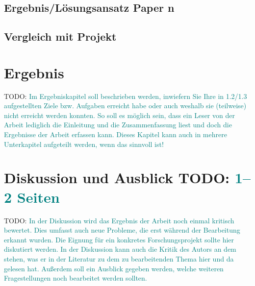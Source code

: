 \documentclass[headsepline,titlepage,ngerman,twoside,12pt]{report}
\newcommand\todo[1]{TODO: \textcolor{teal}{#1}}
\begin{document}
\section{Ergebnis/Lösungsansatz Paper n}
\section{Vergleich mit Projekt}

\chapter{Ergebnis}
\todo{
Im Ergebniskapitel soll beschrieben werden, inwiefern Sie Ihre in 1.2/1.3 aufgestellten Ziele bzw. Aufgaben erreicht habe oder auch weshalb sie (teilweise) nicht erreicht werden konnten.
So soll es möglich sein, dass ein Leser von der Arbeit lediglich die Einleitung und die Zusammenfassung liest und doch die Ergebnisse der Arbeit erfassen kann.
Dieses Kapitel kann auch in mehrere Unterkapitel aufgeteilt werden, wenn das sinnvoll ist!
}

\chapter{Diskussion und Ausblick \todo{1--2 Seiten}}
\todo{
In der Diskussion wird das Ergebnis der Arbeit noch einmal kritisch bewertet.
Dies umfasst auch neue Probleme, die erst während der Bearbeitung erkannt wurden.
Die Eignung für ein konkretes Forschungsprojekt sollte hier diskutiert werden.
In der Diskussion kann auch die Kritik des Autors an dem stehen, was er in der Literatur zu dem zu bearbeitenden Thema hier und da gelesen hat.
Außerdem soll ein Ausblick gegeben werden, welche weiteren Fragestellungen noch bearbeitet werden sollten.
}

\renewcommand{\bibpreamble}{
\todo{
Zentrale Literatur, die den untersuchten Artikeln zugrunde liegt, können Sie im bibtex-Format in die seminar.bib einfügen und dann im Text zitieren, wodurch diese automatisch in das Literaturverzeichnis übernommen werden.
Sie können auch weitere referierte Veröffentlichungen (wissenschaftliche Zeitschriften (auch elektronisch), Bücher) in die Erarbeitung einbeziehen zitieren.
Sie können dafür Literaturdatenbanken wie Pubmed oder Google Scholar durchsuchen und dort direkt als bibtex-Eintrag herunterladen.
Bitte beachten Sie, dass die \href{https://www.openoffice.org/bibliographic/bibtex-defs.html}{bibtex-Einträge vollständig sind}, z.B. sind das bei Büchern Autor, Editor, Title, Kapitel oder Seiten, Herausgeber und Jahr..
Weitere Informationen zum Thema der Literaturrecherche finden sich in den \href{http://www.imise.uni-leipzig.de/Lehre/MedInf/Abschlussarbeiten/Literaturrecherche.jsp}{Hinweisen zur Literaturrecherche}.
\paragraph{Beispielzitierungen}
\citet{his} beschreiben ein Verfahren zur X von Y auf Basis von Z.
Alternativ: X von Y lässt sich auf Basis von Z ermitteln~\citep{his}.
}
}



\end{document}
